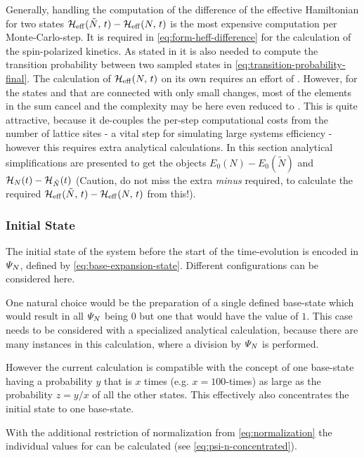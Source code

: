 Generally, handling the computation of the difference of the effective Hamiltonian for two states $\HeffOft[\tilde{N}]-\HeffOft[N]$ is the most expensive computation per Monte-Carlo-step.
It is required in \autoref{eq:form-heff-difference} for the calculation of the spin-polarized kinetics.
As stated in  it is also needed to compute the transition probability between two sampled states in \autoref{eq:transition-probability-final}.
The calculation of $\HeffOft[N]$ on its own requires an effort of .
However, for the states \ketN[N] and  that are connected with only small changes, most of the elements in the sum cancel and the complexity may be here even reduced to .
This is quite attractive, because it de-couples the per-step computational costs from the number of lattice sites - a vital step for simulating large systems efficiency - however this requires extra analytical calculations.
In this section analytical simplifications are presented to get the objects $E_0(N)-E_0(\tilde{N})$ and $\HNOft - \HNOft[\tilde{N}]$ (Caution, do not miss the extra \emph{minus} required, to calculate the required $\HeffOft[\tilde{N}]-\HeffOft[N]$ from this!).

\subsubsection*{Initial State}

The initial state of the system before the start of the time-evolution is encoded in $\psiN$, defined by \autoref{eq:base-expansion-state}. Different configurations can be considered here.

One natural choice would be the preparation of a single defined base-state which would result in all $\psiN$ being $0$ but one that would have the value of $1$. 
This case needs to be considered with a specialized analytical calculation, because there are many instances in this calculation, where a division by $\psiN$ is performed. 

However the current calculation is compatible with the concept of one base-state having a probability $y$ that is $x$ times (e.g. $x=100$-times) as large as the probability $z = y/x$ of all the other states.
This effectively also concentrates the initial state to one base-state.

With the additional restriction of normalization from \autoref{eq:normalization} the individual values for \psiN{} can be calculated (see \autoref{eq:psi-n-concentrated}).

